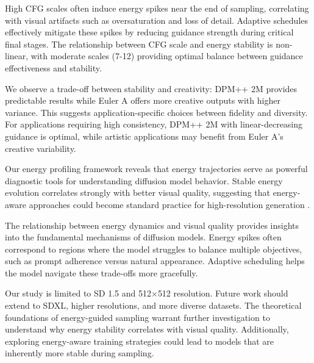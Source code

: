 \documentclass[10pt,twocolumn]{article}
\begin{document}
High CFG scales often induce energy spikes near the end of sampling, correlating with visual artifacts such as oversaturation and loss of detail. Adaptive schedules effectively mitigate these spikes by reducing guidance strength during critical final stages. The relationship between CFG scale and energy stability is non-linear, with moderate scales (7-12) providing optimal balance between guidance effectiveness and stability.

We observe a trade-off between stability and creativity: DPM++ 2M provides predictable results while Euler A offers more creative outputs with higher variance. This suggests application-specific choices between fidelity and diversity. For applications requiring high consistency, DPM++ 2M with linear-decreasing guidance is optimal, while artistic applications may benefit from Euler A's creative variability.

Our energy profiling framework reveals that energy trajectories serve as powerful diagnostic tools for understanding diffusion model behavior. Stable energy evolution correlates strongly with better visual quality, suggesting that energy-aware approaches could become standard practice for high-resolution generation \cite{wang2023hiresfix,song2023rectifiedflow}.

The relationship between energy dynamics and visual quality provides insights into the fundamental mechanisms of diffusion models. Energy spikes often correspond to regions where the model struggles to balance multiple objectives, such as prompt adherence versus natural appearance. Adaptive scheduling helps the model navigate these trade-offs more gracefully.

Our study is limited to SD 1.5 and 512$\times$512 resolution. Future work should extend to SDXL, higher resolutions, and more diverse datasets. The theoretical foundations of energy-guided sampling warrant further investigation to understand why energy stability correlates with visual quality. Additionally, exploring energy-aware training strategies could lead to models that are inherently more stable during sampling.
\end{document}
